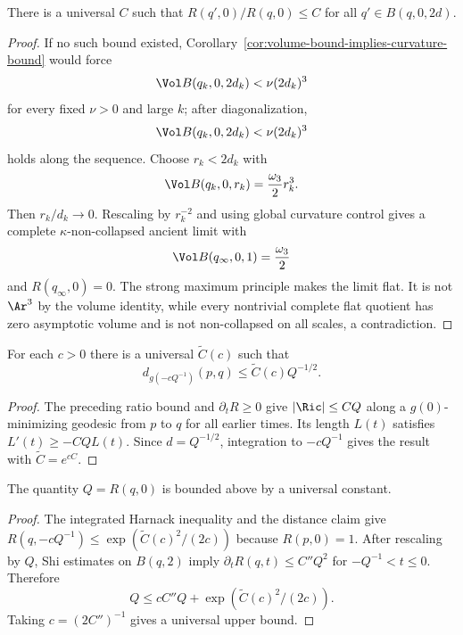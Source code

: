 \begin{claim}\label{claim:curvature-ratio-bound-near-basepoint}
\label{2Rbound}
There is a universal $C$ such that
$R(q',0)/R(q,0)\leq C$ for all $q'\in B(q,0,2d)$.
\end{claim}
\begin{proof}
\sketch If no such bound existed, Corollary~\ref{cor:volume-bound-implies-curvature-bound}
would force
\begin{equation}\label{V3}
 \Vol B(q_k,0,2d_k)<\nu(2d_k)^3
\end{equation}
for every fixed $\nu>0$ and large $k$; after diagonalization,
\begin{equation}\label{lowerbd}
 \Vol B(q_k,0,2d_k)<\nu(2d_k)^3
\end{equation}
holds along the sequence. Choose $r_k<2d_k$ with
\begin{equation}\label{V/2}
 \Vol B(q_k,0,r_k)=\frac{\omega_3}{2}r_k^3.
\end{equation}
Then $r_k/d_k\to0$. Rescaling by $r_k^{-2}$ and using global
curvature control gives a complete $\kappa$-non-collapsed ancient
limit with
\begin{equation}\label{V3/2}
 \Vol B(q_\infty,0,1)=\frac{\omega_3}{2}
\end{equation}
and $R(q_\infty,0)=0$. The strong maximum principle makes the limit
flat. It is not $\Ar^3$ by the volume identity, while every
nontrivial complete flat quotient has zero asymptotic volume and is
not non-collapsed on all scales, a contradiction.
\end{proof}

\begin{claim}\label{claim:distance-bound-under-rescaling}
For each $c>0$ there is a universal $\widetilde C(c)$ such that
\[
 d_{g(-cQ^{-1})}(p,q)\leq\widetilde C(c)Q^{-1/2}.
\]
\end{claim}
\begin{proof}
\sketch The preceding ratio bound and $\partial_tR\geq0$ give
$|\Ric|\leq CQ$ along a $g(0)$-minimizing geodesic from $p$ to
$q$ for all earlier times. Its length $L(t)$ satisfies
$L'(t)\geq-CQL(t)$. Since $d=Q^{-1/2}$, integration to
$-cQ^{-1}$ gives the result with $\widetilde C=e^{cC}$.
\end{proof}

\begin{claim}\label{claim:curvature-upper-bound-universal}
\label{zkbound}
The quantity $Q=R(q,0)$ is bounded above by a universal constant.
\end{claim}
\begin{proof}
\sketch
{}
The integrated Harnack inequality and the distance claim give
$R(q,-cQ^{-1})\leq\exp(\widetilde C(c)^2/(2c))$ because
$R(p,0)=1$. After rescaling by $Q$, Shi estimates on $B(q,2)$ imply
$\partial_tR(q,t)\leq C''Q^2$ for $-Q^{-1}<t\leq0$. Therefore
\[
 Q\leq cC''Q+\exp(\widetilde C(c)^2/(2c)).
\]
Taking $c=(2C'')^{-1}$ gives a universal upper bound.
\end{proof}

